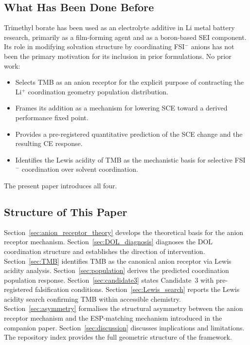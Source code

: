 \documentclass[11pt]{article}
\theoremstyle{plain}
\theoremstyle{definition}
\theoremstyle{remark}
\begin{document}
\subsection{What Has Been Done Before}

Trimethyl borate has been used as an electrolyte additive in Li metal
battery research, primarily as a film-forming agent and as a boron-based
SEI component.  Its role in modifying solvation structure by coordinating
FSI$^-$ anions has not been the primary motivation for its inclusion in
prior formulations.  No prior work:

\begin{itemize}[leftmargin=2em]
  \item Selects TMB as an anion receptor for the explicit purpose of
        contracting the Li$^+$ coordination geometry population
        distribution.
  \item Frames its addition as a mechanism for lowering SCE toward a
        derived performance fixed point.
  \item Provides a pre-registered quantitative prediction of the SCE
        change and the resulting CE response.
  \item Identifies the Lewis acidity of TMB as the mechanistic basis
        for selective FSI$^-$ coordination over solvent coordination.
\end{itemize}

The present paper introduces all four.

\subsection{Structure of This Paper}

Section~\ref{sec:anion_receptor_theory} develops the theoretical basis
for the anion receptor mechanism.  Section~\ref{sec:DOL_diagnosis}
diagnoses the DOL coordination structure and establishes the direction
of intervention.  Section~\ref{sec:TMB} identifies TMB as the canonical
anion receptor via Lewis acidity analysis.  Section~\ref{sec:population}
derives the predicted coordination population response.
Section~\ref{sec:candidate3} states Candidate~3 with pre-registered
falsification conditions.  Section~\ref{sec:Lewis_search} reports the
Lewis acidity search confirming TMB within accessible chemistry.
Section~\ref{sec:asymmetry} formalises the structural asymmetry between
the anion receptor mechanism and the ESP-matching mechanism introduced
in the companion paper.  Section~\ref{sec:discussion} discusses
implications and limitations.  The repository index provides the full
geometric structure of the framework.
\end{document}
